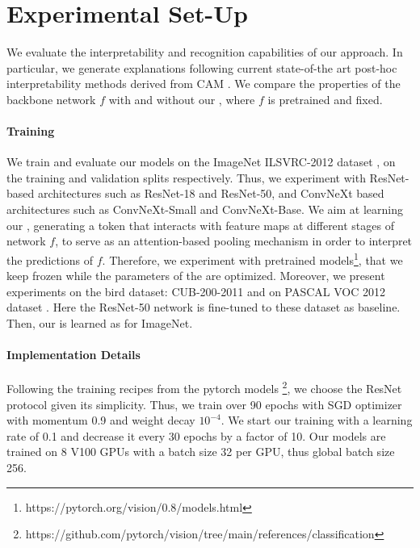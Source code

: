 \section{Experimental Set-Up}
\label{sec:castream_exp}
We evaluate the interpretability and recognition capabilities of our approach. In particular, we 
generate explanations following current state-of-the art post-hoc interpretability methods derived 
from CAM \autocite{zhou2016learning}. We compare the properties of the backbone network $f$ with 
and without our \Ours, where $f$ is pretrained and fixed.

\paragraph{Training}
We train and evaluate our models on the ImageNet ILSVRC-2012 dataset \autocite{ILSVRC15}, 
on the training and validation splits respectively. Thus, we experiment with ResNet-based 
architectures \autocite{he2016deep} such as ResNet-18 and ResNet-50, and ConvNeXt based 
architectures \autocite{liu2022convnet} such as ConvNeXt-Small and ConvNeXt-Base. We aim at 
learning our \Ours, generating a \cls token that interacts with feature maps at different stages of 
network $f$, to serve as an attention-based pooling mechanism in order to interpret the predictions 
of $f$. Therefore, we experiment with pretrained models\footnote{https://pytorch.org/vision/0.8/models.html}, 
that we keep frozen while the parameters of the \Ours are optimized. 
Moreover, we present experiments on the bird dataset: CUB-200-2011 \cite{WahCUB_200_2011} and on 
PASCAL VOC 2012 dataset \cite{Everingham15}. Here the ResNet-50 network is fine-tuned to these 
dataset as baseline. Then, our \Ours is learned as for ImageNet.

\paragraph{Implementation Details}
Following the training recipes from the pytorch models 
\footnote{https://github.com/pytorch/vision/tree/main/references/classification}, we choose the 
ResNet protocol given its simplicity. Thus, we train over 90 epochs with SGD optimizer with 
momentum 0.9 and weight decay $10^{-4}$. We start our training with a learning rate of 0.1 and 
decrease it every 30 epochs by a factor of 10. Our models are trained on 8 V100 GPUs with a batch 
size 32 per GPU,  thus global batch size 256.\\

